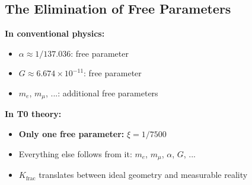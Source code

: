 	\subsection{The Elimination of Free Parameters}
	
	\textbf{In conventional physics:}
	\begin{itemize}
		\item $\alpha \approx 1/137.036$: free parameter
		\item $G \approx 6.674\times10^{-11}$: free parameter  
		\item $m_e$, $m_μ$, ...: additional free parameters
	\end{itemize}
	
	\textbf{In T0 theory:}
	\begin{itemize}
		\item \textbf{Only one free parameter:} $\xi = 1/7500$
		\item Everything else follows from it: $m_e$, $m_μ$, $\alpha$, $G$, ...
		\item $K_{\text{frac}}$ translates between ideal geometry and measurable reality
	\end{itemize}
	